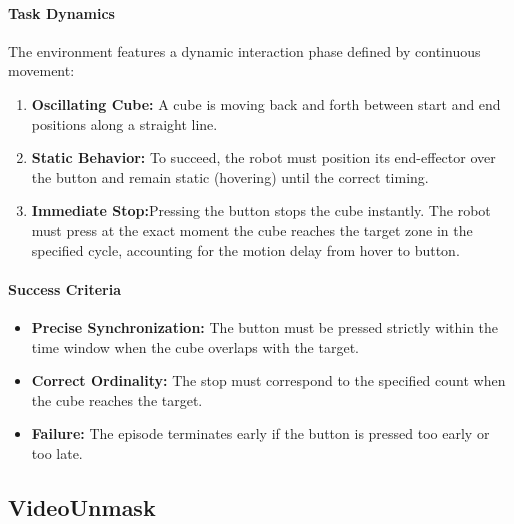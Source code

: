 \paragraph{Task Dynamics}
The environment features a dynamic interaction phase defined by continuous movement:
\begin{enumerate}[itemsep=1pt, topsep=0pt, leftmargin=*]
    \item \textbf{Oscillating Cube:} A cube is moving back and forth between start and end positions along a straight line.
    \item \textbf{Static Behavior:} To succeed, the robot must position its end-effector over the button and remain static (hovering) until the correct timing.
    \item \textbf{Immediate Stop:}Pressing the button stops the cube instantly. The robot must press at the exact moment the cube reaches the target zone in the specified cycle, accounting for the motion delay from hover to button.
\end{enumerate}

\paragraph{Success Criteria}
\begin{itemize}[itemsep=1pt, topsep=0pt, leftmargin=*]
    \item \textbf{Precise Synchronization:} The button must be pressed strictly within the time window when the cube overlaps with the target.
    \item \textbf{Correct Ordinality:} The stop must correspond to the specified count when the cube reaches the target.
    \item \textbf{Failure:} The episode terminates early if the button is pressed too early or too late.
\end{itemize}

\clearpage


\subsection{VideoUnmask}
\label{sec:task_videounmask}

